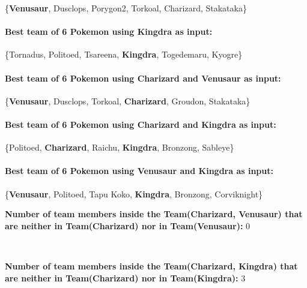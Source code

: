 \documentclass[10pt]{article}
\begin{document}
\begin{center}
\{\textbf{Venusaur}, Dusclops, Porygon2, Torkoal, Charizard, Stakataka\}
\end{center}

\paragraph{Best team of 6 Pokemon using Kingdra as input:}

\begin{center}
\{Tornadus, Politoed, Tsareena, \textbf{Kingdra}, Togedemaru, Kyogre\}
\end{center}

\paragraph{Best team of 6 Pokemon using Charizard and Venusaur as input:}

\begin{center}
\{\textbf{Venusaur}, Dusclops, Torkoal, \textbf{Charizard}, Groudon, Stakataka\}
\end{center}

\paragraph{Best team of 6 Pokemon using Charizard and Kingdra as input:}

\begin{center}
\{Politoed, \textbf{Charizard}, Raichu, \textbf{Kingdra}, Bronzong, Sableye\}
\end{center}

\paragraph{Best team of 6 Pokemon using Venusaur and Kingdra as input:}

\begin{center}
\{\textbf{Venusaur}, Politoed, Tapu Koko, \textbf{Kingdra}, Bronzong, Corviknight\}
\end{center}

\textbf{Number of team members inside the Team(Charizard, Venusaur) that are neither in Team(Charizard) nor in Team(Venusaur):} 0

\

\textbf{Number of team members inside the Team(Charizard, Kingdra) that are neither in Team(Charizard) nor in Team(Kingdra):} 3

\
\end{document}
